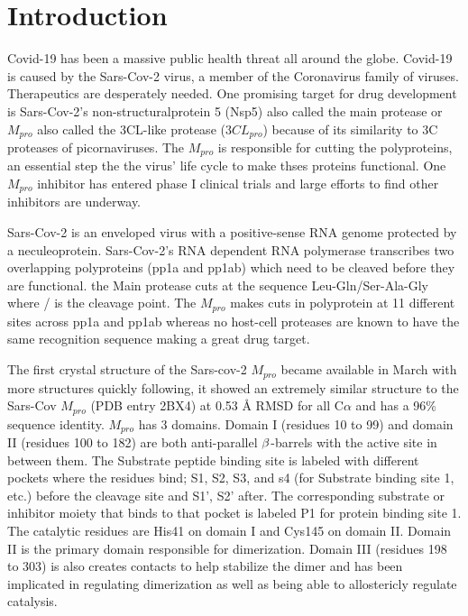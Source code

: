 \documentclass{biophys-new}
\begin{document}
\section*{Introduction}

Covid-19 has been a massive public health threat all around the globe. Covid-19 is caused by the Sars-Cov-2 virus, a member of the Coronavirus family of viruses. Therapeutics are desperately needed. One promising target for drug development is Sars-Cov-2's non-structuralprotein 5 (Nsp5) also called the main protease or $M_{pro}$ also called the 3CL-like protease ($3CL_{pro}$) because of its similarity to 3C proteases of picornaviruses\cite{tan2005ph}. The $M_{pro}$ is responsible for cutting the polyproteins, an essential step the the virus' life cycle to make thses proteins functional. One $M_{pro}$ inhibitor has entered phase I clinical trials and large efforts to find other inhibitors are underway.

Sars-Cov-2 is an enveloped virus with a positive-sense RNA genome protected by a neculeoprotein. Sars-Cov-2's RNA dependent RNA polymerase transcribes two overlapping polyproteins (pp1a and pp1ab) which need to be cleaved before they are functional. the Main protease cuts at the sequence Leu-Gln/Ser-Ala-Gly  where / is the cleavage point\cite{Zhang409}. The $M_{pro}$ makes cuts in polyprotein at 11 different sites across pp1a and pp1ab whereas no host-cell proteases are known to have the same recognition sequence making a great drug target\cite{hilgenfeld2014sars}. 

The first crystal structure of the Sars-cov-2 $M_{pro}$ became available in March \cite{Zhang409} with more structures quickly following\cite{owen2020sars}, it showed an extremely similar structure to the Sars-Cov $M_{pro}$ (PDB entry 2BX4)\cite{tan2005ph} at 0.53 Å RMSD for all C$\alpha$ and has a 96\% sequence identity\cite{Zhang409}. $M_{pro}$ has 3 domains. Domain I (residues 10 to 99) and domain II (residues 100 to 182) are both anti-parallel $\MakeUppercase{\beta}$-barrels with the active site in between them. The Substrate peptide binding site is labeled with different pockets where the residues bind; S1, S2, S3, and s4 (for Substrate binding site 1, etc.) before the cleavage site and S1', S2' after. The corresponding substrate or inhibitor moiety that binds to that pocket is labeled P1 for protein binding site 1. The catalytic residues are His41 on domain I and Cys145 on domain II. Domain II is the primary domain responsible for dimerization. Domain III (residues 198 to 303) is also creates contacts to help stabilize the dimer and has been implicated in regulating dimerization as well as being able to allostericly regulate catalysis.
\end{document}
